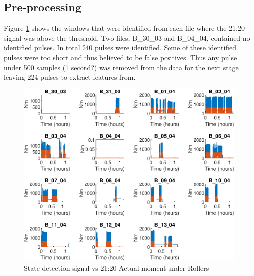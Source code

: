 \documentclass{article}
\begin{document}
\subsection{Pre-processing}
Figure \ref{fig:StateDetection} shows the windows that were identified from each file where the 21.20 signal was above the threshold. Two files, B\_30\_03 and B\_04\_04, contained no identified pulses. In total 240 pulses were identified. Some of these identified pulses were too short and thus believed to be false positives. Thus any pulse under 500 samples (1 second?) was removed from the data for the next stage leaving 224 pulses to extract features from.

\begin{figure}[H]
    \centering
    \includegraphics[width=\textwidth, height=\textheight, keepaspectratio]{figures/StateDetectionFig.eps}
    \caption{State detection signal vs 21:20 Actual moment under Rollers}
    \label{fig:StateDetection}
\end{figure}
\end{document}
